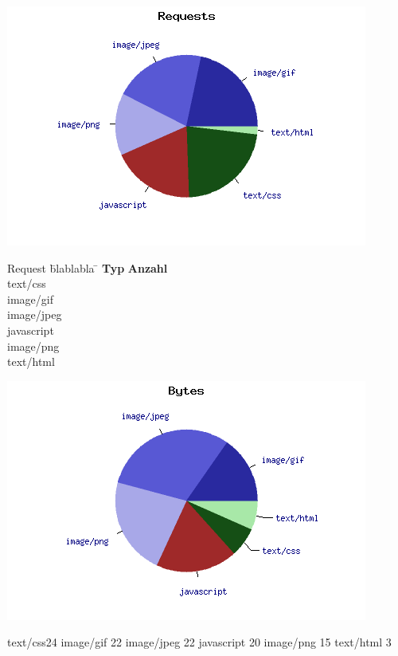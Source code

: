 \includegraphics[scale=0.5]{material/start_request_pie.png}
\begin{tabbing}
Request \quad\= blablabla \quad\= \kill
\textbf{Typ} 	 \> \textbf{Anzahl} \\
text/css	  	\\
image/gif	  	\\
image/jpeg	  	\\
javascript	  	\\ 
image/png	  	\\
text/html	  	\\

\end{tabbing}

\includegraphics[scale=0.5]{material/start_byte_pie.png}



text/css24
image/gif	22
image/jpeg	22
javascript	20
image/png	15
text/html	3

